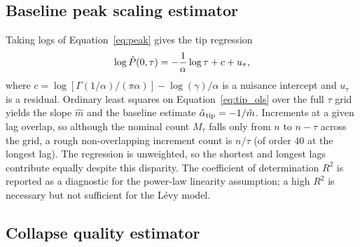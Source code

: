 \documentclass[conference]{IEEEtran}
\begin{document}
\subsection{Baseline peak scaling estimator}
\label{sec:methodology:tip}

Taking logs of Equation~\eqref{eq:peak} gives the tip regression
\begin{equation}
  \log\hat{P}(0,\tau)
  = -\frac{1}{\alpha}\log\tau + c + u_\tau,
  \label{eq:tip_ols}
\end{equation}
where $c = \log[\Gamma(1/\alpha)/(\pi\alpha)] - \log(\gamma)/\alpha$ is a
nuisance intercept and $u_\tau$ is a residual. Ordinary least squares on
Equation~\eqref{eq:tip_ols} over the full $\tau$ grid yields the slope
$\hat{m}$ and the baseline estimate $\hat{\alpha}_{\mathrm{tip}} = -1/\hat{m}$.
Increments at a given lag overlap, so although the nominal count $M_\tau$
falls only from $n$ to $n-\tau$ across the grid, a rough non-overlapping
increment count is $n/\tau$ (of order $40$ at the longest lag). The regression is unweighted, so the shortest and longest
lags contribute equally despite this disparity.
The coefficient of determination $R^2$ is reported as a diagnostic for the
power-law linearity assumption; a high $R^2$ is necessary but not sufficient
for the Lévy model.

\subsection{Collapse quality estimator}
\label{sec:methodology:collapse}
\end{document}
